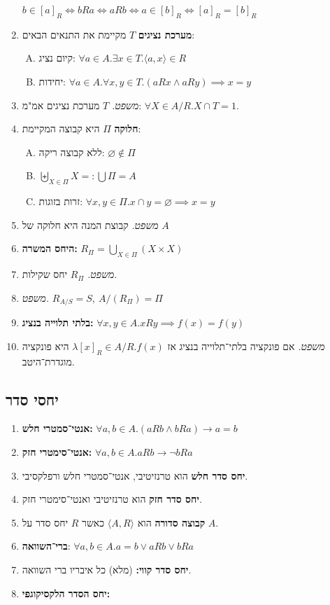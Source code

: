 \documentclass[]{article}
\newcommand\sso   {\rightarrow}
\newcommand\ra    {\rangle}
\newcommand\la    {\langle}
\newcommand\tho       {\textit{משפט. }}
\newcommand\tiff      {\!\iff\!}
\begin{document}
\begin{multicols}{2}
\begin{enumerate}[resume]
				\hfill $ b \in [a]_R \tiff bRa \tiff aRb \tiff a \in [b]_R \tiff [a]_R = [b]_R $
			\item \textbf{מערכת נציגים }$T$ מקיימת את התנאים הבאים: 
			\begin{enumerate}[A)]
				\item קיום נציג: \hfill $\forall a \in A. \exists x \in T. \la a, x \ra \in R$
				\item יחידות: \hfill $\forall a \in A. \forall x, y \in T. (aRx \land aRy) \implies x = y$
			\end{enumerate}
			\item \tho $T$ מערכת נציגים אמ"מ: \hfill $\forall X \in A / R. X \cap T = 1$. 
			\item \textbf{חלוקה} $\Pi$ היא קבוצה המקיימת: 
			\begin{enumerate}[A)]
				\item ללא קבוצה ריקה: \hfill $\varnothing \notin \Pi$
				\item \hfill $\biguplus_{X \in \Pi}X =: \bigcup \Pi = A$
				\item זרות בזוגות: \hfill $\forall x, y \in \Pi. x \cap y = \varnothing \implies x = y$
			\end{enumerate}
			\item \tho קבוצת המנה היא חלוקה של $A$
			\item \textbf{היחס המשרה:} \hfill $R_\Pi = \bigcup_{X \in \Pi}(X \times X)$
			\item \tho $R_\Pi$ יחס שקילות. 
			\item \tho \hfill $R_{A / S} = S, \ A / (R_\Pi) = \Pi$
			\item \textbf{בלתי תלוייה בנציג:} \hfill $\forall x, y \in A. xRy \implies f(x) = f(y)$
			\item \tho אם פונקציה בלתי־תלוייה בנציג אז $\lambda [x]_R \in A / R. f(x)$ היא פונקציה מוגדרת־היטב. 
		\end{enumerate}
		\subsection{יחסי סדר}
		\begin{enumerate}[resume]
			\item \textbf{אנטי־סמטרי חלש: }\hfill $\forall a, b \in A. (aRb \land bRa) \sso a = b$
			\item \textbf{אנטי־סימטרי חזק: }\hfill $\forall a, b \in A. aRb \sso \lnot bRa$
			\item \textbf{יחס סדר חלש }הוא טרנזיטיבי, אנטי־סמטרי חלש ורפלקסיבי. 
			\item \textbf{יחס סדר חזק }הוא טרנזיטיבי ואנטי־סימטרי חזק. 
			\item \textbf{קבוצה סדורה }הוא $\la A, R \ra$ כאשר $R$ יחס סדר על $A$. 
			\item \textbf{ברי־השוואה}: \hfill $\forall a, b \in A. a = b \lor aRb \lor bRa$
			\item \textbf{יחס סדר קווי: }(מלא) כל איבריו ברי השוואה. 
			\item \textbf{יחס הסדר הלקסיקוגפי: }
				

\end{enumerate}
\end{multicols}
\end{document}
